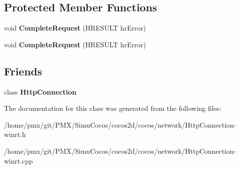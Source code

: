 \subsection*{Protected Member Functions}
\begin{DoxyCompactItemize}
\item 
\mbox{\label{classnetwork_1_1CXHR2Callback_a2eef19bf5eba0470a894227651901aba}} 
void {\bfseries Complete\+Request} (H\+R\+E\+S\+U\+LT hr\+Error)
\item 
\mbox{\label{classnetwork_1_1CXHR2Callback_a2eef19bf5eba0470a894227651901aba}} 
void {\bfseries Complete\+Request} (H\+R\+E\+S\+U\+LT hr\+Error)
\end{DoxyCompactItemize}
\subsection*{Friends}
\begin{DoxyCompactItemize}
\item 
\mbox{\label{classnetwork_1_1CXHR2Callback_addb126386153633a3ecc1cd973ef2104}} 
class {\bfseries Http\+Connection}
\end{DoxyCompactItemize}


The documentation for this class was generated from the following files\+:\begin{DoxyCompactItemize}
\item 
/home/pmx/git/\+P\+M\+X/\+Simu\+Cocos/cocos2d/cocos/network/Http\+Connection-\/winrt.\+h\item 
/home/pmx/git/\+P\+M\+X/\+Simu\+Cocos/cocos2d/cocos/network/Http\+Connection-\/winrt.\+cpp\end{DoxyCompactItemize}
